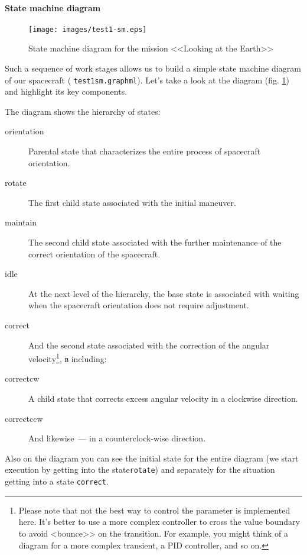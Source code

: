 \documentclass[12pt,a4paper]{article}
\begin{document}
\paragraph{State machine diagram}

\begin{figure}[tbh]
  \begin{center}
    \texttt{[image: images/test1-sm.eps]}
    \caption{State machine diagram for the mission <<Looking at the Earth>>}
    \label{Pic:Test1SM}
  \end{center}
\end{figure}

Such a sequence of work stages allows us to build a simple state machine diagram of our spacecraft ( \verb'test1sm.graphml'). Let's take a look at the diagram (fig.
\ref{Pic:Test1SM}) and highlight its key components.

The diagram shows the hierarchy of states:

\begin{description}
\item[orientation] Parental state that characterizes the entire process of spacecraft orientation.
\item[rotate] The first child state associated with the initial maneuver.
\item[maintain] The second child state associated with the further maintenance of the correct orientation of the spacecraft.
\item[idle] At the next level of the hierarchy, the base state is associated with waiting when
the spacecraft orientation does not require adjustment.
\item[correct] And the second state associated with the correction of the angular velocity\footnote{Please note that not the best way to control the parameter is implemented here. It's better to use a more complex controller to cross the value boundary to avoid <bounce>> on the transition. For example, you might think of a diagram for a more complex transient, a PID controller, and so on.}, в including:
\item[correct\textunderscore cw] A child state that corrects excess angular velocity in a clockwise direction.
\item[correct\textunderscore ccw] And likewise~--- in a counterclock-wise direction.
\end{description}

Also on the diagram you can see the initial state for the entire diagram (we start execution by getting into the state\verb'rotate') and separately for the situation getting into a state \verb'correct'.
\end{document}
